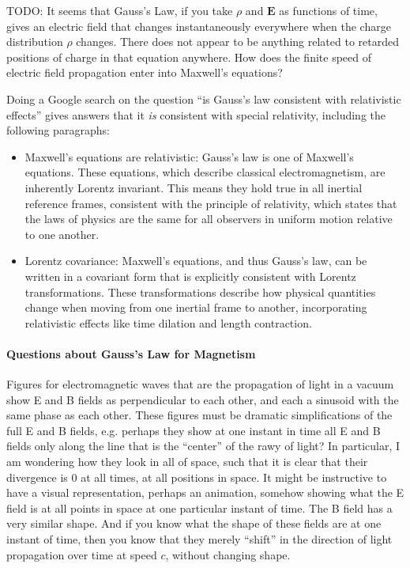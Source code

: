 \documentclass[a4paper]{article}
\theoremstyle{plain}
\theoremstyle{definition}
\newcommand{\vect}[1]{\textbf{#1}}
\begin{document}
TODO: It seems that Gauss's Law, if you take $\rho$ and $\vect{E}$ as
functions of time, gives an electric field that changes
instantaneously everywhere when the charge distribution $\rho$
changes.  There does not appear to be anything related to retarded
positions of charge in that equation anywhere.  How does the finite
speed of electric field propagation enter into Maxwell's equations?

Doing a Google search on the question ``is Gauss's law consistent with
relativistic effects'' gives answers that it {\em is} consistent with
special relativity, including the following paragraphs:

\begin{itemize}
\item
Maxwell's equations are relativistic: Gauss's law is one of Maxwell's
equations.  These equations, which describe classical
electromagnetism, are inherently Lorentz invariant.  This means they
hold true in all inertial reference frames, consistent with the
principle of relativity, which states that the laws of physics are the
same for all observers in uniform motion relative to one another.
\item
Lorentz covariance: Maxwell's equations, and thus Gauss's law, can be
written in a covariant form that is explicitly consistent with Lorentz
transformations.  These transformations describe how physical
quantities change when moving from one inertial frame to another,
incorporating relativistic effects like time dilation and length
contraction.
\end{itemize}


\paragraph{Questions about Gauss's Law for Magnetism}

Figures for electromagnetic waves that are the propagation of light in
a vacuum show E and B fields as perpendicular to each other, and each
a sinusoid with the same phase as each other.  These figures must be
dramatic simplifications of the full E and B fields, e.g. perhaps they
show at one instant in time all E and B fields only along the line
that is the ``center'' of the rawy of light?  In particular, I am
wondering how they look in all of space, such that it is clear that
their divergence is 0 at all times, at all positions in space.  It
might be instructive to have a visual representation, perhaps an
animation, somehow showing what the E field is at all points in space
at one particular instant of time.  The B field has a very similar
shape.  And if you know what the shape of these fields are at one
instant of time, then you know that they merely ``shift'' in the
direction of light propagation over time at speed $c$, without
changing shape.
\end{document}
